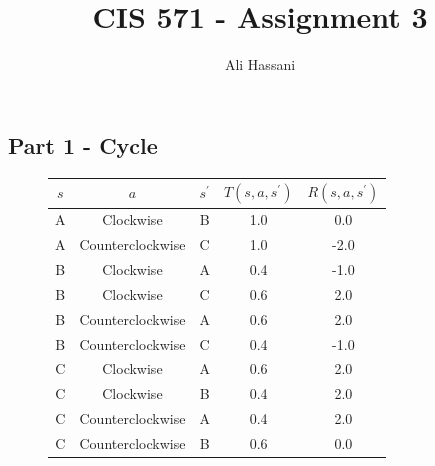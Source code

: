 \documentclass{homework}
\title{CIS 571 - Assignment 3}
\author{Ali Hassani}
\begin{document}
\maketitle

\renewcommand{\theenumi}{\alph{enumi}}
\renewcommand{\theenumii}{\roman{enumii}}

\exercise[1]

\subsection{Part 1 - Cycle}
\begin{figure}[h!]
    \centering
    \begin{minipage}[b]{0.49\textwidth}
        \centering
        
    \end{minipage}
    \begin{minipage}[b]{0.49\textwidth}
        \begin{tabular}{c|c|c|c|c}
            \toprule
            $s$ & $a$ & $s^{\prime}$ & $T(s, a, s^{\prime})$ & $R(s, a, s^{\prime})$ \\
            \midrule
            A & Clockwise & B & 1.0 & 0.0 \\
            A & Counterclockwise & C & 1.0 & -2.0 \\
            B & Clockwise & A & 0.4 & -1.0 \\
            B & Clockwise & C & 0.6 & 2.0 \\
            B & Counterclockwise & A & 0.6 & 2.0 \\
            B & Counterclockwise & C & 0.4 & -1.0 \\
            C & Clockwise & A & 0.6 & 2.0 \\
            C & Clockwise & B & 0.4 & 2.0 \\
            C & Counterclockwise & A & 0.4 & 2.0 \\
            C & Counterclockwise & B & 0.6 & 0.0 \\
            \bottomrule
        \end{tabular}
    \end{minipage}
    \label{fig:q1}
\end{figure}
%     
\end{document}
